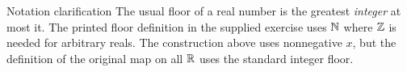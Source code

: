 \begin{note}{Notation clarification}
The usual floor of a real number is the greatest \emph{integer} at most it. The printed floor definition in the supplied exercise uses $\mathbb N$ where $\mathbb Z$ is needed for arbitrary reals. The construction above uses nonnegative $x$, but the definition of the original map on all $\mathbb R$ uses the standard integer floor.
\end{note}

